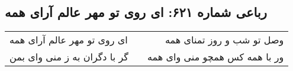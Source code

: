\begin{center}
\section*{رباعی شماره ۶۲۱: ای روی تو مهر عالم آرای همه}
\label{sec:sh621}
\begin{longtable}{l p{0.5cm} r}
ای روی تو مهر عالم آرای همه
&&
وصل تو شب و روز تمنای همه
\\
گر با دگران به ز منی وای بمن
&&
ور با همه کس همچو منی وای همه
\\
\end{longtable}
\end{center}
